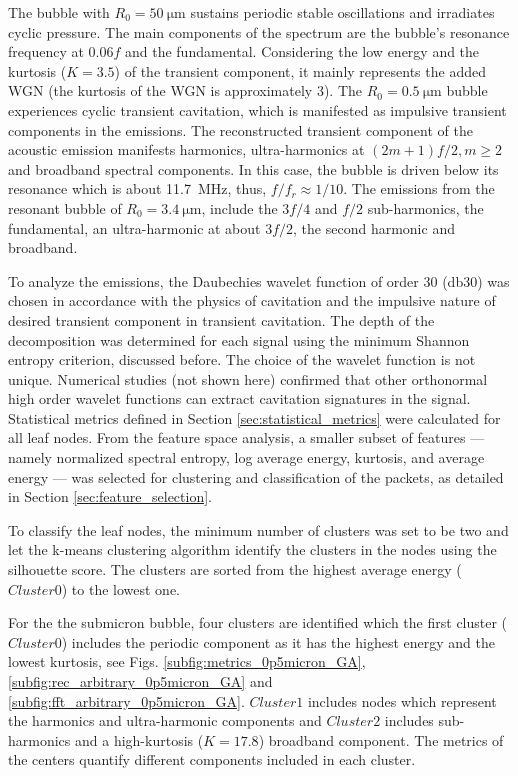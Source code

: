 \documentclass[preprint, linenumbers]{revtex4-2}
\newcommand{\km}{k-means }
\begin{document}
The bubble with $R_0=\SI{50}{\micro\metre}$ sustains periodic stable oscillations and irradiates cyclic pressure. The main components of the spectrum are the bubble's resonance frequency at $0.06f$ and the fundamental. Considering the low energy and the kurtosis ($K=3.5$) of the transient component, it mainly represents the added WGN (the kurtosis of the WGN is approximately 3). The $R_0=\SI{0.5}{\micro\metre}$ bubble experiences cyclic transient cavitation, which is manifested as impulsive transient components in the emissions. The reconstructed transient component of the acoustic emission manifests harmonics, ultra-harmonics at $(2m+1)f/2, m\geq 2$ and broadband spectral components. In this case, the bubble is driven below its resonance which is about \SI{11.7}{\mega\hertz}, thus, $f/f_r \approx 1/10$. The emissions from the resonant bubble of $R_0=\SI{3.4}{\micro\metre}$, include the $3f/4$ and $f/2$ sub-harmonics, the fundamental, an ultra-harmonic at about $3f/2$, the second harmonic and broadband. 
		
To analyze the emissions, the Daubechies wavelet function of order 30 (db30) was chosen in accordance with the physics of cavitation and the impulsive nature of desired transient component in transient cavitation. The depth of the decomposition was determined for each signal using the minimum Shannon entropy criterion, discussed before. The choice of the wavelet function is not unique. Numerical studies (not shown here) confirmed that other orthonormal high order wavelet functions can extract cavitation signatures in the signal. Statistical metrics defined in Section \ref{sec:statistical_metrics} were calculated for all leaf nodes. From the feature space analysis, a smaller subset of features — namely normalized spectral entropy, log average energy, kurtosis, and average energy — was selected for clustering and classification of the packets, as detailed in Section \ref{sec:feature_selection}. 
			
To classify the leaf nodes, the minimum number of clusters was set to be two and let the \km clustering algorithm identify the clusters in the nodes using the silhouette score. The clusters are sorted from the highest average energy ($Cluster 0$) to the lowest one.

For the the submicron bubble, four clusters are identified which the first cluster ($Cluster 0$) includes the periodic component as it has the highest energy and the lowest kurtosis, see Figs. \ref{subfig:metrics_0p5micron_GA}, \ref{subfig:rec_arbitrary_0p5micron_GA} and \ref{subfig:fft_arbitrary_0p5micron_GA}. $Cluster 1$ includes nodes which represent the harmonics and ultra-harmonic components and $Cluster 2$ includes sub-harmonics and a high-kurtosis ($K=17.8$) broadband component. The metrics of the centers quantify different components included in each cluster. 
\end{document}
